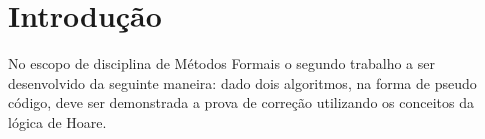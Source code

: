 \section{Introdução}
No escopo de disciplina de Métodos Formais o segundo trabalho a ser desenvolvido
da seguinte maneira: dado dois algoritmos, na forma de pseudo código, deve ser
demonstrada a prova de correção utilizando os conceitos da lógica de Hoare.
\begin{minipage}[t]{5cm}
    \vspace{0pt}  
    \begin{algorithm}[H]
    \end{algorithm}
\end{minipage}%
\begin{minipage}[t]{5cm}
    \vspace{0pt}
    \begin{algorithm}[H]
    \end{algorithm}
\end{minipage}

